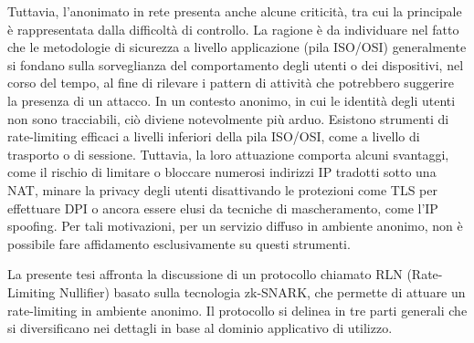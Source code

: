 Tuttavia, l'anonimato in rete presenta anche alcune criticità, tra cui la principale è rappresentata dalla difficoltà di controllo. La ragione è da individuare nel fatto che le metodologie di sicurezza a livello applicazione (pila ISO/OSI) generalmente si fondano sulla sorveglianza del comportamento degli utenti o dei dispositivi, nel corso del tempo, al fine di rilevare i pattern di attività che potrebbero suggerire la presenza di un attacco. In un contesto anonimo, in cui le identità degli utenti non sono tracciabili, ciò diviene notevolmente più arduo. Esistono strumenti di rate-limiting efficaci a livelli inferiori della pila ISO/OSI, come a livello di trasporto o di sessione. Tuttavia, la loro attuazione comporta alcuni svantaggi, come il rischio di limitare o bloccare numerosi indirizzi IP tradotti sotto una NAT, minare la privacy degli utenti disattivando le protezioni come TLS per effettuare DPI o ancora essere elusi da tecniche di mascheramento, come l'IP spoofing. Per tali motivazioni, per un servizio diffuso in ambiente anonimo, non è possibile fare affidamento esclusivamente su questi strumenti.\par
\clearpage
La presente tesi affronta la discussione di un protocollo chiamato RLN (Rate-Limiting Nullifier) basato sulla tecnologia zk-SNARK, che permette di attuare un rate-limiting in ambiente anonimo. Il protocollo si delinea in tre parti generali che si diversificano nei dettagli in base al dominio applicativo di utilizzo. \par

